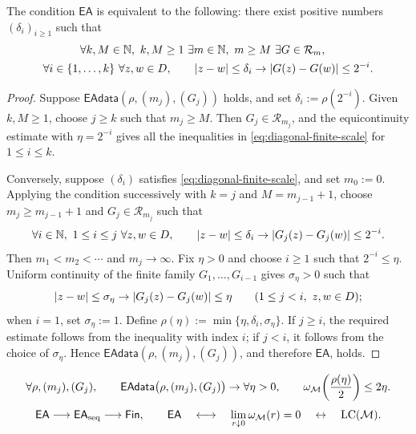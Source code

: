  \begin{proposition}
 \label{prop:diagonal-finite-scale}
 The condition \(\mathsf{EA}\) is equivalent to the following: there
 exist positive numbers \((\delta_i)_{i\ge1}\) such that
 \begin{equation}
  \begin{gathered}
  \forall k,M\in\mathbb N,\ k,M\ge1\ \exists m\in\mathbb N,\ m\ge M\
  \exists G\in\mathcal R_m,\quad\\
  \forall i\in\{1,\ldots,k\}\ \forall z,w\in D,\qquad
  |z-w|\le\delta_i\to
  |G(z)-G(w)|\le2^{-i}.
  \end{gathered}
  \label{eq:diagonal-finite-scale}
 \end{equation}
 \end{proposition}
 \begin{proof}
 Suppose \(\mathsf{EAdata}(\rho,(m_j),(G_j))\) holds, and set
 \(\delta_i:=\rho(2^{-i})\). Given \(k,M\ge1\), choose \(j\ge k\)
 such that \(m_j\ge M\). Then \(G_j\in\mathcal R_{m_j}\), and the
 equicontinuity estimate with \(\eta=2^{-i}\) gives all the inequalities
 in \eqref{eq:diagonal-finite-scale} for \(1\le i\le k\).

 Conversely, suppose \((\delta_i)\) satisfies
 \eqref{eq:diagonal-finite-scale}, and set \(m_0:=0\). Applying the
 condition successively with \(k=j\) and \(M=m_{j-1}+1\), choose
 \(m_j\ge m_{j-1}+1\) and \(G_j\in\mathcal R_{m_j}\) such that
 \[
  \forall i\in\N,\ 1\le i\le j\ \forall z,w\in\D,\qquad
  |z-w|\le\delta_i\to
  |G_j(z)-G_j(w)|\le2^{-i}.
 \]
 Then \(m_1<m_2<\cdots\) and \(m_j\to\infty\). Fix \(\eta>0\) and
 choose \(i\ge1\) such that \(2^{-i}\le\eta\). Uniform continuity of
 the finite family \(G_1,\ldots,G_{i-1}\) gives \(\sigma_\eta>0\) such
 that
 \[
  |z-w|\le\sigma_\eta\to
  |G_j(z)-G_j(w)|\le\eta
  \qquad(1\le j<i,\ z,w\in D);
 \]
 when \(i=1\), set \(\sigma_\eta:=1\). Define
 \(\rho(\eta):=\min\{\eta,\delta_i,\sigma_\eta\}\). If \(j\ge i\), the
 required estimate follows from the inequality with index \(i\); if
 \(j<i\), it follows from the choice of \(\sigma_\eta\). Hence
 \(\mathsf{EAdata}(\rho,(m_j),(G_j))\), and therefore \(\mathsf{EA}\),
 holds.
 \end{proof}
 \begin{equation}
  \forall\rho,(m_j),(G_j),\qquad
   \mathsf{EAdata}\bigl(\rho,(m_j),(G_j)\bigr)
 \to
  \forall\eta>0,\qquad
  \omega_\mathcal M\!\left(\frac{\rho(\eta)}2\right)\le2\eta.
  \label{eq:quantitative-diameter-bound}
\end{equation}
\begin{equation}
  \begin{gathered}
  \mathsf{EA}\longrightarrow\mathsf{EA}_{\mathrm{seq}}
  \longrightarrow\mathsf{Fin},\qquad
  \mathsf{EA}\quad\longleftrightarrow\quad
  \lim_{r\downarrow0}\omega_\mathcal M(r)=0
  \quad\leftrightarrow\quad\operatorname{LC}(\mathcal M).
  \end{gathered}
 \label{eq:main-discrepancy}
\end{equation}

